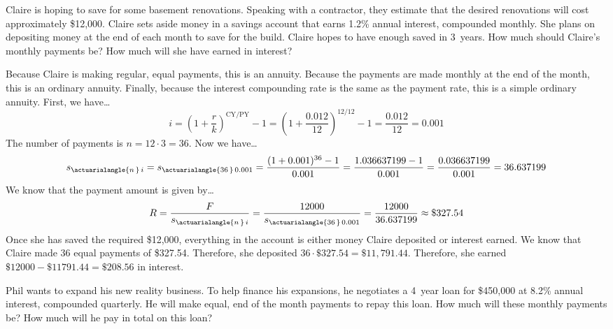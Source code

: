 \documentclass[11pt,letterpaper]{article}
\begin{document}

 Claire is hoping to save for some basement renovations. Speaking with a contractor, they estimate that the desired renovations will cost approximately \$12,000. Claire sets aside money in a savings account that earns 1.2\% annual interest, compounded monthly. She plans on depositing money at the end of each month to save for the build. Claire hopes to have enough saved in 3~years. How much should Claire's monthly payments be? How much will she have earned in interest? \pspace

\sol Because Claire is making regular, equal payments, this is an annuity. Because the payments are made monthly at the end of the month, this is an ordinary annuity. Finally, because the interest compounding rate is the same as the payment rate, this is a simple ordinary annuity. First, we have\dots
	\[
	i= \left(1 + \dfrac{r}{k} \right)^{\text{CY}/\text{PY}} - 1= \left(1 + \dfrac{0.012}{12} \right)^{12/12} - 1= \dfrac{0.012}{12}= 0.001
	\]
The number of payments is $n= 12 \cdot 3= 36$. Now we have\dots
	\[
	s_{\actuarialangle{n\,}\, i}= s_{\actuarialangle{36\,}\, 0.001}= \dfrac{(1 + 0.001)^{36} - 1}{0.001}= \dfrac{1.036637199 - 1}{0.001}= \dfrac{0.036637199}{0.001}= 36.637199
	\]
We know that the payment amount is given by\dots
	\[
	R= \frac{F}{s_{\actuarialangle{n\,}\, i}}= \dfrac{12000}{s_{\actuarialangle{36\,}\, 0.001}}= \dfrac{12000}{36.637199} \approx \$327.54
	\]
Once she has saved the required \$12,000, everything in the account is either money Claire deposited or interest earned. We know that Claire made 36 equal payments of \$327.54. Therefore, she deposited $36 \cdot \$327.54= \$11,791.44$. Therefore, she earned $\$12000 - \$11791.44= \$208.56$ in interest. 



\newpage



 Phil wants to expand his new reality business. To help finance his expansions, he negotiates a 4~year loan for \$450,000 at 8.2\% annual interest, compounded quarterly. He will make equal, end of the month payments to repay this loan. How much will these monthly payments be? How much will he pay in total on this loan? \pspace
\end{document}
